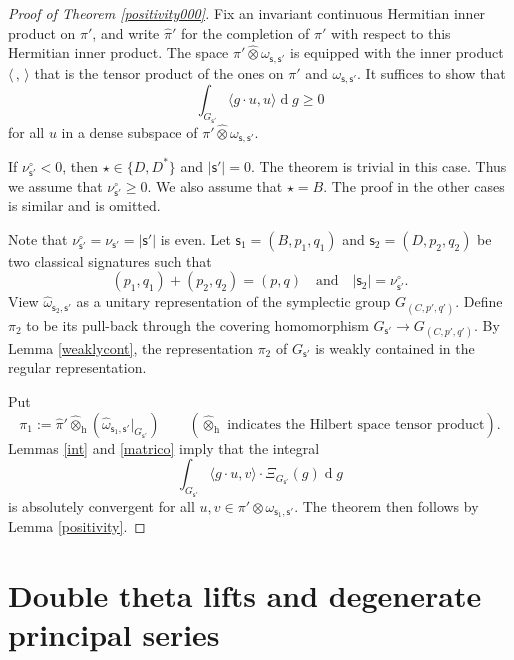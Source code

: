 \documentclass[12pt,a4paper]{amsart}
\def\abs#1{\left|{#1}\right|}
\newcommand{\od}{\operatorname{d}}
\newcommand{\la}{\langle}
\newcommand{\ra}{\rangle}
\numberwithin{equation}{section}
\theoremstyle{remark}
\begin{document}
\begin{proof}[Proof of Theorem \ref{positivity000}]
Fix an invariant continuous Hermitian inner product on $\pi'$, and  write $\hat \pi'$ for the completion of $\pi'$ with respect to this Hermitian inner product.
The space $\pi' \widehat \otimes \omega_{\mathsf s, \mathsf s'}$ is equipped with the  inner product $\la\,,\,\ra$  that is the tensor product of the ones on $\pi'$ and $\omega_{\mathsf s, \mathsf s'} $. It suffices to show that
\[
  \int_{G_{\mathsf s'}}\la g \cdot u,u\ra\od\! g\geq 0
\]
for all $u$ in a dense subspace of $\pi' \widehat \otimes \omega_{\mathsf s, \mathsf s'}$.

If $\nu^\circ_{\mathsf s'}<0$, then $\star\in \{D, D^*\}$ and $\abs{\mathsf s'}=0$. The theorem is trivial in this case.  Thus we assume that $\nu^\circ_{\mathsf s'}\geq 0$.
We also assume that $\star=B$. The proof in the other cases is similar and is omitted.

Note that $\nu^\circ_{\mathsf s'}=\nu_{\mathsf s'}=\abs{\mathsf s'}$ is even.
 Let $\mathsf s_1=(B, p_1, q_1)$ and  $\mathsf s_2=(D, p_2, q_2)$ be two classical signatures such that
\[
  (p_1, q_1)+(p_2, q_2)=(p,q)\quad \textrm{and}\quad \abs{\mathsf s_2}=\nu^\circ_{\mathsf s'}.
\]
View $\hat \omega_{\mathsf s_2, \mathsf s'}$ as a unitary representation of the symplectic group $G_{(C, p',q')}$.
Define $\pi_2$ to be its  pull-back through the covering homomorphism $G_{\mathsf s'}\rightarrow G_{(C, p',q')}$. By Lemma \ref{weaklycont}, the representation $\pi_2$ of $G_{\mathsf s'}$ is weakly contained in the regular representation.

Put
\[
  \pi_1:=\hat \pi'\widehat \otimes_{\mathrm h} (\hat \omega_{\mathsf s_1, \mathsf s'}|_{G_{\mathsf s'}})\qquad (\textrm{$\widehat \otimes_{\mathrm h}$ indicates the Hilbert space tensor product}).
\]
 Lemmas  \ref{int} and \ref{matrico} imply that the integral
\[
 \int_{G_{\mathsf s'}} \la g\cdot u,v\ra \cdot \Xi_{G_{\mathsf s'}}(g)\od\!g
\]
is absolutely convergent for all $u,v\in \pi' \otimes \omega_{\mathsf s_1, \mathsf s'}$. The theorem then follows by Lemma \ref{positivity}.



\end{proof}



\section{Double theta lifts and degenerate principal series}
\end{document}
